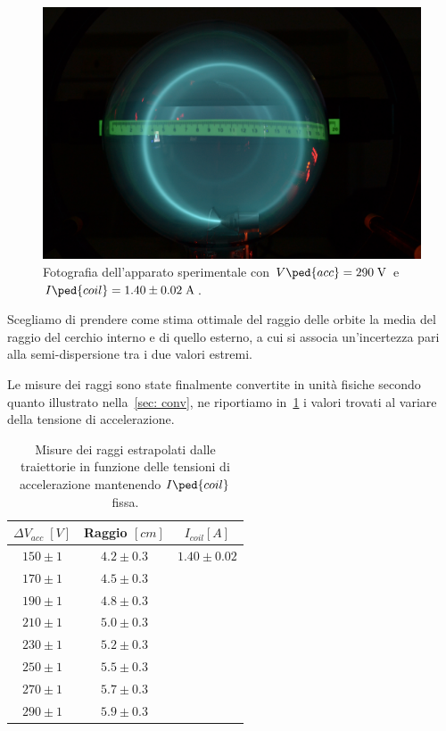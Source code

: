 \documentclass[10pt, a4paper, italian]{article}
\begin{document}
\begin{figure}[htbp]
\includegraphics[width=\textwidth]{DSC_0120}
\caption{Fotografia dell'apparato sperimentale con $V\ped{acc} = 290 \; \si{V}$
e $I\ped{coil} = 1.40 \pm 0.02 \; \si{A}$.
\label{fig: fot}}
\end{figure}
Scegliamo di prendere come stima ottimale del raggio delle orbite la
media del raggio del cerchio interno e di quello esterno, a cui si associa
un'incertezza pari alla semi-dispersione tra i due valori estremi.

Le misure dei raggi sono state finalmente convertite in unità fisiche secondo
quanto illustrato nella~\cref{sec: conv}, ne riportiamo in~\cref{tab: IVrad} i
valori trovati al variare della tensione di accelerazione.
\begin{table}[htbp]
\centering
\begin{tabular}{cc|c}
\toprule
$\Delta V_{acc} \; [\si{V}]$ & Raggio $[\si{cm}]$ & $I_{coil} [A]$ \\
\midrule
$150 \pm 1$ & $4.2 \pm 0.3$ & $1.40 \pm 0.02$\\
$170 \pm 1$ & $4.5 \pm 0.3$ & \\
$190 \pm 1$ & $4.8 \pm 0.3$ & \\
$210 \pm 1$ & $5.0 \pm 0.3$ & \\
$230 \pm 1$ & $5.2 \pm 0.3$ & \\
$250 \pm 1$ & $5.5 \pm 0.3$ & \\
$270 \pm 1$ & $5.7 \pm 0.3$ & \\
$290 \pm 1$ & $5.9 \pm 0.3$ & \\
\bottomrule
\end{tabular}
\caption{Misure dei raggi estrapolati dalle traiettorie in funzione delle
tensioni di accelerazione mantenendo $I\ped{coil}$ fissa.
\label{tab: IVrad}}
\end{table}
\end{document}

